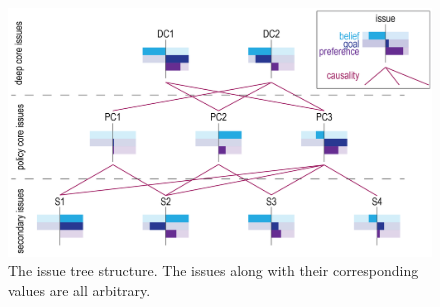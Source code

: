 \documentclass[11pt]{article}
\begin{document}
\begin{figure}
\centering
\includegraphics[width = \linewidth, angle = 0]{figures/IssueTree-01}
\caption{The issue tree structure. The issues along with their corresponding values are all arbitrary.}
\label{fig:IssueTree-01}
\end{figure}
\end{document}
